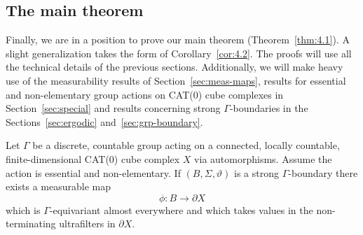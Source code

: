 \subsection{The main theorem}
\label{sec:main-proof}

Finally, we are in a position to prove our main theorem (Theorem~\ref{thm:4.1}). A slight generalization takes the form of Corollary~\ref{cor:4.2}. The proofs will use all the technical details of the previous sections. Additionally, we will make heavy use of the measurability results of Section~\ref{sec:meas-maps}, results for essential and non-elementary group actions on CAT(0) cube complexes in Section~\ref{sec:special} and results concerning strong \(\Gamma\)-boundaries in the Sections~\ref{sec:ergodic} and~\ref{sec:grp-boundary}.

\begin{thm}[{\cite[Theorem~4.1]{MR3509968}}]
  \label{thm:4.1}
  Let \(\Gamma\) be a discrete, countable group acting on a connected, locally countable, finite-dimensional CAT(0) cube complex \(X\) via automorphisms. Assume the action is essential and non-elementary. If \((B, \Sigma, \vartheta)\) is a strong \(\Gamma\)-boundary there exists a measurable map
  \[
    \phi\colon B \to \partial X
  \]
  which is \(\Gamma\)-equivariant almost everywhere and which takes values in the non-terminating ultrafilters in \(\partial X\).
\end{thm}

